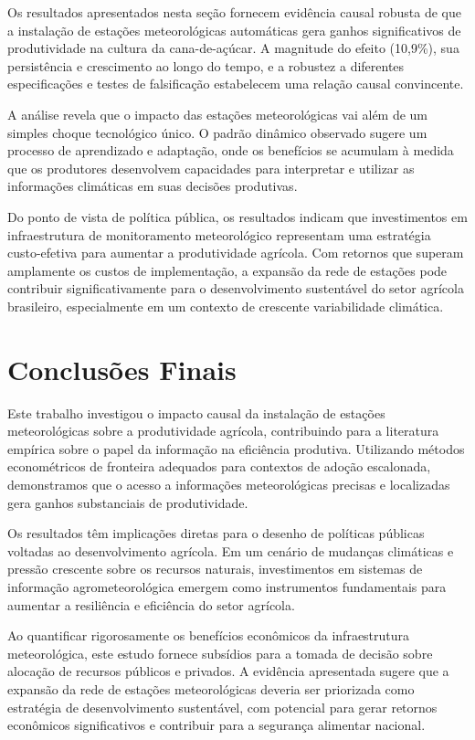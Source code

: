\documentclass[
	12pt,				%
	openright,			%
	oneside,			%
	a4paper,			%
	english,			%
	french,				%
	spanish,			%
	brazil				%
	]{abntex2}
\begin{document}
Os resultados apresentados nesta seção fornecem evidência causal robusta de que a instalação de estações meteorológicas automáticas gera ganhos significativos de produtividade na cultura da cana-de-açúcar. A magnitude do efeito (10,9\%), sua persistência e crescimento ao longo do tempo, e a robustez a diferentes especificações e testes de falsificação estabelecem uma relação causal convincente.

A análise revela que o impacto das estações meteorológicas vai além de um simples choque tecnológico único. O padrão dinâmico observado sugere um processo de aprendizado e adaptação, onde os benefícios se acumulam à medida que os produtores desenvolvem capacidades para interpretar e utilizar as informações climáticas em suas decisões produtivas.

Do ponto de vista de política pública, os resultados indicam que investimentos em infraestrutura de monitoramento meteorológico representam uma estratégia custo-efetiva para aumentar a produtividade agrícola. Com retornos que superam amplamente os custos de implementação, a expansão da rede de estações pode contribuir significativamente para o desenvolvimento sustentável do setor agrícola brasileiro, especialmente em um contexto de crescente variabilidade climática.

\chapter{Conclusões Finais}

Este trabalho investigou o impacto causal da instalação de estações meteorológicas sobre a produtividade agrícola, contribuindo para a literatura empírica sobre o papel da informação na eficiência produtiva. Utilizando métodos econométricos de fronteira adequados para contextos de adoção escalonada, demonstramos que o acesso a informações meteorológicas precisas e localizadas gera ganhos substanciais de produtividade.

Os resultados têm implicações diretas para o desenho de políticas públicas voltadas ao desenvolvimento agrícola. Em um cenário de mudanças climáticas e pressão crescente sobre os recursos naturais, investimentos em sistemas de informação agrometeorológica emergem como instrumentos fundamentais para aumentar a resiliência e eficiência do setor agrícola.

Ao quantificar rigorosamente os benefícios econômicos da infraestrutura meteorológica, este estudo fornece subsídios para a tomada de decisão sobre alocação de recursos públicos e privados. A evidência apresentada sugere que a expansão da rede de estações meteorológicas deveria ser priorizada como estratégia de desenvolvimento sustentável, com potencial para gerar retornos econômicos significativos e contribuir para a segurança alimentar nacional.
\end{document}
